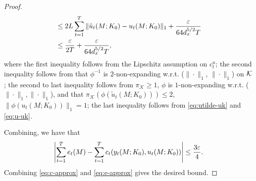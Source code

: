 \begin{proof}
\begin{align*}
&\le 2L\sum_{t=1}^T \|\tilde{u}_t(M;K_0)-u_t(M;K_0)\|_1+\frac{\varepsilon}{64d_x^{5/2}T}\\
&\le \frac{\varepsilon}{2T}+\frac{\varepsilon}{64d_x^{5/2}T},
\end{align*}
where the first inequality follows from the Lipschitz assumption on $c_t^u$; the second inequality follows from that $\phi^{-1}$ is $2$-non-expanding w.r.t. ($\|\cdot\|_1$, $\|\cdot\|_1$) on $\mathcal{K}$; the second to last inequality follows from $\pi_{\mathcal{K}}\ge 1$, $\phi$ is $1$-non-expanding w.r.t. ($\|\cdot\|_1,\|\cdot\|_1$), and that $\pi_{\mathcal{K}}(\phi(\tilde{u}_t(M;K_0)))\le 2$, $\|\phi(u_t(M;K_0))\|_1=1$; the last inequality follows from \cref{eq:utilde-uk} and \cref{eq:u-uk}.

Combining, we have that
\begin{align}
\label{eq:e-approx}
\left|\sum_{t=1}^T e_t(M)-\sum_{t=1}^T c_t(y_t(M;K_0),u_t(M;K_0))\right|\le \frac{3\varepsilon}{4}.
\end{align} 
Combining \cref{eq:c-approx} and \cref{eq:e-approx} gives the desired bound.
\end{proof}

